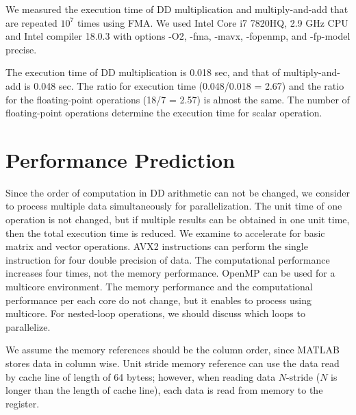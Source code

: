 \documentclass{IOS-Book-Article}
\begin{document}
We measured the execution time of DD multiplication and multiply-and-add that are repeated $10^7$ times using FMA.
We used Intel Core i7 7820HQ, 2.9 GHz CPU and Intel compiler 18.0.3 with options -O2, -fma, -mavx, -fopenmp, and -fp-model precise. 

The execution time of DD multiplication is 0.018 sec, and that of multiply-and-add is 0.048 sec. The ratio for execution time (0.048/0.018 = 2.67) and the ratio for the floating-point operations (18/7 = 2.57) is almost the same. The number of floating-point operations determine the execution time for scalar operation.

\section{Performance Prediction}
Since the order of computation in DD arithmetic can not be changed, we consider to process multiple data simultaneously for parallelization.
The unit time of one operation is not changed, but if multiple results can be obtained in one unit time, then the total execution time is reduced.
We examine to accelerate for basic matrix and vector operations.
AVX2 instructions\cite{SIMD} can perform the single instruction for four double precision of data. The computational performance increases four times, not the memory performance.
OpenMP\cite{omp} can be used for a multicore environment. The memory performance and the computational performance per each core do not change, but it enables to process using multicore. For nested-loop operations, we should discuss which loops to parallelize. 

We assume the memory references should be the column order, since MATLAB stores data in column wise. Unit stride memory reference can use the data read by cache line of length of 64 bytess; however, when reading data $N$-stride ($N$ is longer than the length of cache line), each data is read from memory to the register\cite{HPC}. 
\end{document}
